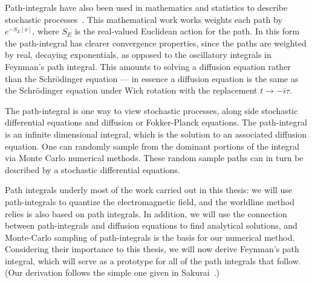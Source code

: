     Path-integrals have also been used in mathematics and statistics to describe stochastic 
    processes~\cite{Kac1949,Durrett1996, Karatzas1991}.  This mathematical work works weights each
    path by $e^{-S_{E}[x]}$, where $S_E$ is the real-valued Euclidean action for the path.
    In this form the path-integral has clearer convergence properties, 
    since the paths are weighted by real, decaying exponentials, as opposed to the oscillatory integrals
    in Feynman's path integral.  This amounts to solving a diffusion equation rather than the Schr\"odinger equation
    --- in essence a diffusion equation is the same as the Schr\"odinger equation under Wick rotation 
    with the replacement $t\rightarrow -i\tau$.

    The path-integral is one way to view stochastic processes, along side stochastic differential
    equations and diffusion or Fokker-Planck equations. 
    The path-integral is an infinite dimensional integral, which is the solution to an associated 
    diffusion equation.  One can randomly sample from the 
    dominant portions of the integral via Monte Carlo numerical methods.  These random sample paths can
    in turn be described by a stochastic differential equations.  
        
    Path integrals underly most of the work carried out in this thesis: we will use path-integrals
    to quantize the electromagnetic field, and the worldline method relies is also based on path integrals.
    In addition, we will use the connection between path-integrals and diffusion equations
    to find analytical solutions, and Monte-Carlo sampling of path-integrals is the basis for our numerical
    method.      Considering their importance to this thesis, we will 
    now derive Feynman's path integral, which will serve as a prototype for all of the path integrals
    that follow.  (Our derivation follows the simple one given in Sakurai~\cite{Sakurai1994}.)

    
